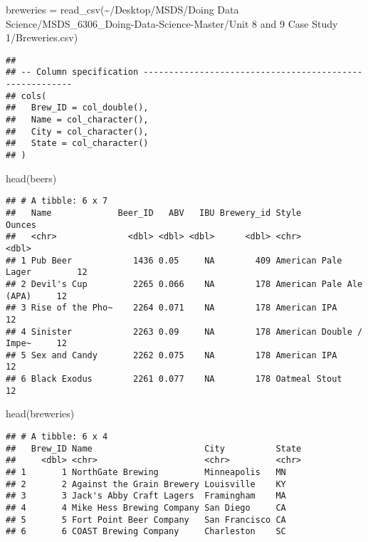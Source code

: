 \documentclass[
]{article}
\newenvironment{Shaded}{\begin{snugshade}}{\end{snugshade}}
\newcommand{\FunctionTok}[1]{\textcolor[rgb]{0.00,0.00,0.00}{#1}}
\newcommand{\NormalTok}[1]{#1}
\newcommand{\OtherTok}[1]{\textcolor[rgb]{0.56,0.35,0.01}{#1}}
\newcommand{\StringTok}[1]{\textcolor[rgb]{0.31,0.60,0.02}{#1}}
\begin{document}
\begin{Shaded}
\begin{Highlighting}[]
\NormalTok{breweries }\OtherTok{=} \FunctionTok{read\_csv}\NormalTok{(}\StringTok{\textquotesingle{}\textasciitilde{}/Desktop/MSDS/Doing Data Science/MSDS\_6306\_Doing{-}Data{-}Science{-}Master/Unit 8 and 9 Case Study 1/Breweries.csv\textquotesingle{}}\NormalTok{)}
\end{Highlighting}
\end{Shaded}

\begin{verbatim}
## 
## -- Column specification --------------------------------------------------------
## cols(
##   Brew_ID = col_double(),
##   Name = col_character(),
##   City = col_character(),
##   State = col_character()
## )
\end{verbatim}

\begin{Shaded}
\begin{Highlighting}[]
\FunctionTok{head}\NormalTok{(beers)}
\end{Highlighting}
\end{Shaded}

\begin{verbatim}
## # A tibble: 6 x 7
##   Name             Beer_ID   ABV   IBU Brewery_id Style                   Ounces
##   <chr>              <dbl> <dbl> <dbl>      <dbl> <chr>                    <dbl>
## 1 Pub Beer            1436 0.05     NA        409 American Pale Lager         12
## 2 Devil's Cup         2265 0.066    NA        178 American Pale Ale (APA)     12
## 3 Rise of the Pho~    2264 0.071    NA        178 American IPA                12
## 4 Sinister            2263 0.09     NA        178 American Double / Impe~     12
## 5 Sex and Candy       2262 0.075    NA        178 American IPA                12
## 6 Black Exodus        2261 0.077    NA        178 Oatmeal Stout               12
\end{verbatim}

\begin{Shaded}
\begin{Highlighting}[]
\FunctionTok{head}\NormalTok{(breweries)}
\end{Highlighting}
\end{Shaded}

\begin{verbatim}
## # A tibble: 6 x 4
##   Brew_ID Name                      City          State
##     <dbl> <chr>                     <chr>         <chr>
## 1       1 NorthGate Brewing         Minneapolis   MN   
## 2       2 Against the Grain Brewery Louisville    KY   
## 3       3 Jack's Abby Craft Lagers  Framingham    MA   
## 4       4 Mike Hess Brewing Company San Diego     CA   
## 5       5 Fort Point Beer Company   San Francisco CA   
## 6       6 COAST Brewing Company     Charleston    SC
\end{verbatim}
\end{document}
